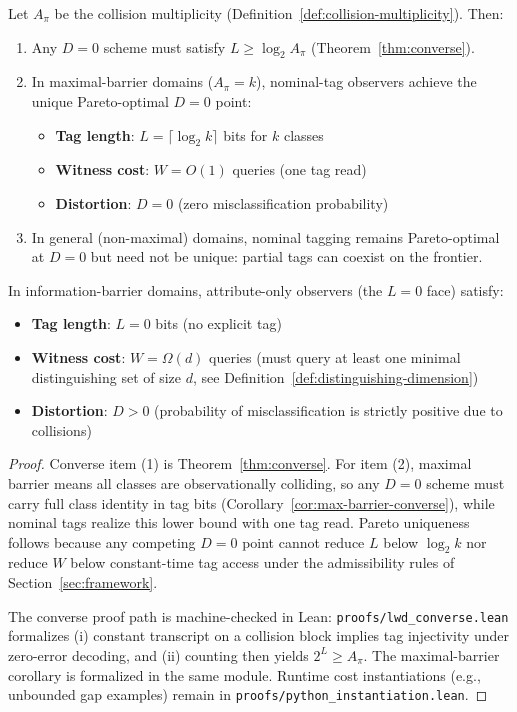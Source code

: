 \begin{theorem}\label{thm:lwd-optimal}
Let $A_\pi$ be the collision multiplicity (Definition~\ref{def:collision-multiplicity}). Then:
\begin{enumerate}
\item Any $D=0$ scheme must satisfy $L \ge \log_2 A_\pi$ (Theorem~\ref{thm:converse}).
\item In maximal-barrier domains ($A_\pi = k$), nominal-tag observers achieve the unique Pareto-optimal $D=0$ point:
\begin{itemize}
\item \textbf{Tag length}: $L = \lceil \log_2 k \rceil$ bits for $k$ classes
\item \textbf{Witness cost}: $W = O(1)$ queries (one tag read)
\item \textbf{Distortion}: $D = 0$ (zero misclassification probability)
\end{itemize}
\item In general (non-maximal) domains, nominal tagging remains Pareto-optimal at $D=0$ but need not be unique: partial tags can coexist on the frontier.
\end{enumerate}

In information-barrier domains, attribute-only observers (the $L=0$ face) satisfy:
\begin{itemize}
\item \textbf{Tag length}: $L = 0$ bits (no explicit tag)
\item \textbf{Witness cost}: $W = \Omega(d)$ queries (must query at least one minimal distinguishing set of size $d$, see Definition~\ref{def:distinguishing-dimension})
\item \textbf{Distortion}: $D > 0$ (probability of misclassification is strictly positive due to collisions)
\end{itemize}
\end{theorem}

\begin{proof}
Converse item (1) is Theorem~\ref{thm:converse}. For item (2), maximal barrier means all classes are observationally colliding, so any $D=0$ scheme must carry full class identity in tag bits (Corollary~\ref{cor:max-barrier-converse}), while nominal tags realize this lower bound with one tag read. Pareto uniqueness follows because any competing $D=0$ point cannot reduce $L$ below $\log_2 k$ nor reduce $W$ below constant-time tag access under the admissibility rules of Section~\ref{sec:framework}.

The converse proof path is machine-checked in Lean: \texttt{proofs/lwd\_converse.lean} formalizes (i) constant transcript on a collision block implies tag injectivity under zero-error decoding, and (ii) counting then yields $2^L \ge A_\pi$. The maximal-barrier corollary is formalized in the same module. Runtime cost instantiations (e.g., unbounded gap examples) remain in \texttt{proofs/python\_instantiation.lean}.
\end{proof}

